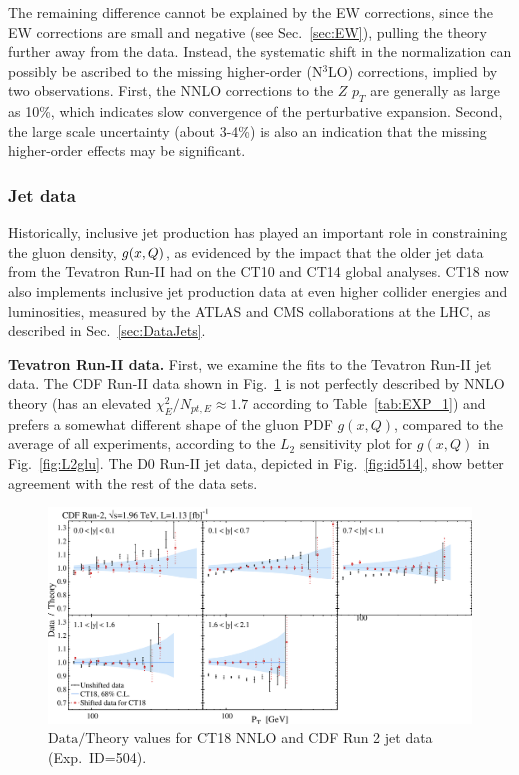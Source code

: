 The remaining difference cannot be explained by the %
EW corrections, 
since the EW corrections are small and negative (see Sec.~\ref{sec:EW}), 
pulling the theory further away from the data. Instead, the systematic shift in the normalization can possibly be ascribed to the missing higher-order (N$^{3}$LO) corrections, implied by two observations. First, the NNLO corrections to the $Z$ $p_{T}$ are generally as large as 10\%, which indicates 
slow convergence of the perturbative expansion. Second, the large 
scale uncertainty (about 3-4\%) is also an indication that the missing 
higher-order effects may be significant.


\subsubsection{Jet data}
\label{sec:Jet_fit}
%
%
Historically, inclusive jet production has played an important role in constraining the gluon density, $g(x,Q)$, as evidenced by the impact that the older jet data from the Tevatron Run-II had on the CT10 and CT14 global analyses.  CT18 now also implements inclusive jet production data at even higher collider energies and  luminosities, measured by the ATLAS and CMS collaborations at the LHC, as described in Sec.~\ref{sec:DataJets}.

{\bf Tevatron Run-II data.}
%
%
First, we examine the fits to the Tevatron Run-II jet data. 
The CDF Run-II 
data shown in Fig.~\ref{fig:id504} is not perfectly described by NNLO theory (has an elevated $\chi^2_E/N_{pt,E}\approx 1.7$ according to Table~\ref{tab:EXP_1}) and prefers a somewhat different shape of the gluon PDF $g(x,Q)$, compared to the average of all experiments, according to the $L_2$ sensitivity plot for $g(x,Q)$ in Fig.~\ref{fig:L2glu}. The D0 Run-II jet data, depicted in Fig.~\ref{fig:id514}, show better agreement with the rest of the data sets.

\begin{figure}[b]
	\includegraphics[width=1.0\textwidth]{./fig/data_504_CT18__com_DoT_hori_ect.pdf}
	\caption{$\mathrm{Data}/\mathrm{Theory}$ values for CT18 NNLO and CDF Run 2 jet data (Exp.~ID=504).
		 \label{fig:id504}}
\end{figure}

